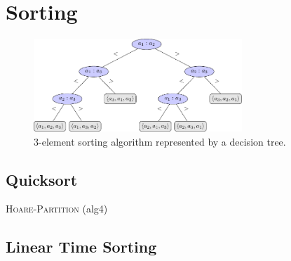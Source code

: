 
\chapter{Sorting}	\label{chapter:sorting}

\begin{figure}
  \centering
  \includegraphics[width = 0.70\textwidth]{figs/3-sorting}
  \caption{$3$-element sorting algorithm represented by a decision tree.}
  \label{fig:3-sorting}
\end{figure}





\section{Quicksort}

\textsc{Hoare-Partition} (alg4)


\section{Linear Time Sorting}


